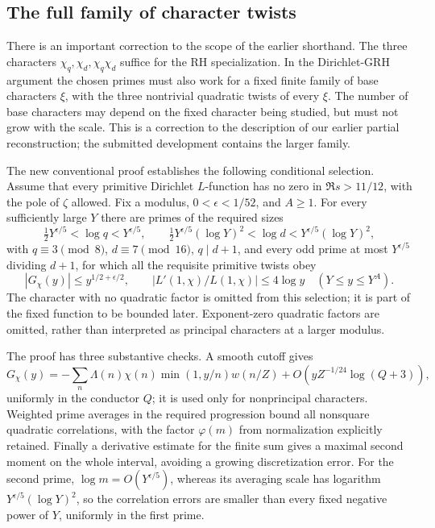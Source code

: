 \documentclass[11pt,a4paper]{article}
\theoremstyle{remark}
\begin{document}
\subsection{The full family of character twists}

There is an important correction to the scope of the earlier shorthand.
The three characters $\chi_q,\chi_d,\chi_q\chi_d$ suffice for the RH
specialization. In the Dirichlet-GRH argument the chosen primes must
also work for a fixed finite family of base characters $\xi$, with the
three nontrivial quadratic twists of every $\xi$. The number of base
characters may depend on the fixed character being studied, but must
not grow with the scale. This is a correction to the description of
our earlier partial reconstruction; the submitted development contains
the larger family.

The new conventional proof establishes the following conditional
selection. Assume that every primitive Dirichlet $L$-function has no
zero in $\Re s>11/12$, with the pole of $\zeta$ allowed. Fix a modulus,
$0<\epsilon<1/52$, and $A\ge1$. For every sufficiently large $Y$
there are primes of the required sizes
\[
 \tfrac12Y^{\epsilon/5}<\log q<Y^{\epsilon/5},\qquad
 \tfrac12Y^{\epsilon/5}(\log Y)^2<\log d
                  <Y^{\epsilon/5}(\log Y)^2,
\]
with $q\equiv3\pmod8$, $d\equiv7\pmod{16}$,
$q\mid d+1$, and every odd prime at most $Y^{\epsilon/5}$
dividing $d+1$, for which all the requisite primitive twists obey
\[
       |G_\chi(y)|\le y^{1/2+\epsilon/2},\qquad
       |L'(1,\chi)/L(1,\chi)|\le4\log y
                     \quad(Y\le y\le Y^A).
\]
The character with no quadratic factor is omitted from this selection;
it is part of the fixed function to be bounded later. Exponent-zero
quadratic factors are omitted, rather than interpreted as principal
characters at a larger modulus.

The proof has three substantive checks. A smooth cutoff gives
\[
 G_\chi(y)=-\sum_n\Lambda(n)\chi(n)\min(1,y/n)w(n/Z)
             +O(yZ^{-1/24}\log(Q+3)),
\]
uniformly in the conductor $Q$; it is used only for nonprincipal
characters. Weighted prime averages in the required progression bound
all nonsquare quadratic correlations, with the factor $\varphi(m)$
from normalization explicitly retained. Finally a derivative estimate
for the finite sum gives a maximal second moment on the whole
interval, avoiding a growing discretization error. For the second
prime, $\log m=O(Y^{\epsilon/5})$, whereas its averaging scale has
logarithm $Y^{\epsilon/5}(\log Y)^2$, so the correlation errors are
smaller than every fixed negative power of $Y$, uniformly in the
first prime.
\end{document}
